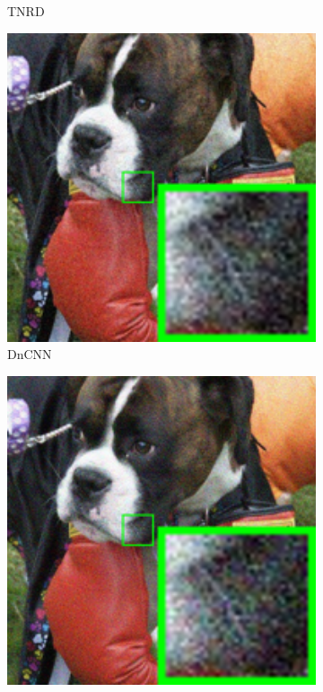 \begin{figure}
\begin{subfigure}[t]{0.24\textwidth}
\caption{TNRD}
    \end{subfigure}
    \hfill
    \begin{subfigure}[t]{0.24\textwidth}
        \centering
        \includegraphics[width=1\textwidth]{images/twsc/nc/resize_br_DnCNN_dog.png}
\caption{DnCNN}
    \end{subfigure}
\hfill
    \begin{subfigure}[t]{0.24\textwidth}
        \centering
        \includegraphics[width=1\textwidth]{images/twsc/nc/resize_br_NI_dog.png}

\end{subfigure}
\end{figure}
